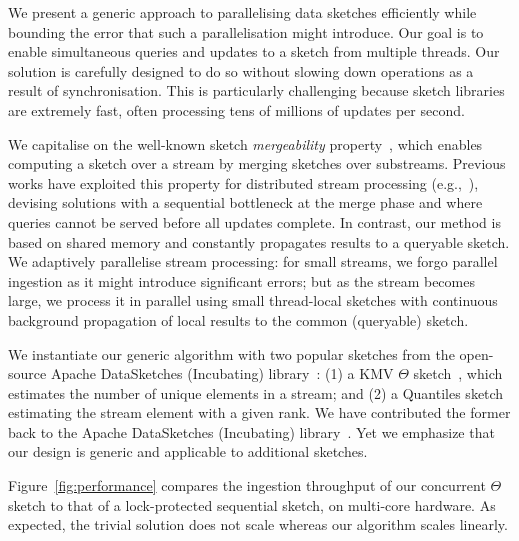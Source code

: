 We present a generic approach to parallelising data sketches efficiently while bounding the error that such a 
parallelisation might introduce. Our goal is to enable simultaneous queries and updates to a sketch from 
multiple  threads. Our solution is carefully designed to do so without slowing down operations as a result of synchronisation.
This is particularly challenging because sketch libraries are extremely fast, often processing tens of millions of updates per second. 

We capitalise on the well-known sketch \emph{mergeability} property~\cite{Cormode:2017}, which enables computing a sketch 
over a stream by merging sketches over substreams. Previous works have exploited this property for distributed 
stream processing (e.g.,~\cite{GoogleHLL:2013, cormode2011algorithms}), devising solutions with a sequential bottleneck at the merge phase and where queries cannot
be served before all updates complete. 
In contrast, our method is based on shared memory and constantly propagates results to a queryable sketch.
We adaptively parallelise  stream processing:  
for small streams, we forgo parallel ingestion as it might introduce significant errors;  
but as the stream becomes large, we process it in parallel using small
thread-local sketches with continuous background propagation of local results to the common (queryable) sketch.

We instantiate our generic algorithm with two popular sketches from the open-source Apache DataSketches 
(Incubating) library~\cite{DataSketches}:  
(1) a KMV $\Theta$ sketch~\cite{KMV}, which estimates the number of unique elements in a stream;
and (2) a Quantiles sketch~\cite{Agarwal:2012} estimating the stream element with a given rank. 
We have contributed the former back to the Apache DataSketches (Incubating) library~\cite{ConcurrentThetaImp}. 
Yet we emphasize that our design is generic and applicable to additional sketches. 

Figure~\ref{fig:performance} compares
the ingestion throughput of our concurrent $\Theta$ sketch to that of a lock-protected sequential sketch,
on multi-core hardware. As expected, the trivial solution does not scale whereas our algorithm scales linearly. 

